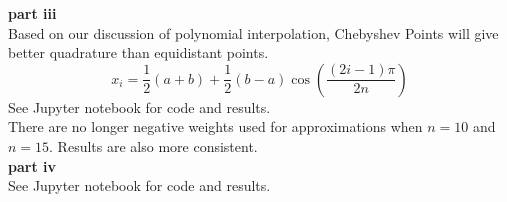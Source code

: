 \documentclass{article} %
\begin{document}
\textbf{part iii} \\
Based on our discussion of polynomial interpolation, Chebyshev Points will give better quadrature than equidistant points.
\begin{equation*}
x_i = \frac{1}{2}(a+b) + \frac{1}{2}(b-a)\cos(\frac{(2i-1)\pi}{2n})
\end{equation*}
See Jupyter notebook for code and results. \\
There are no longer negative weights used for approximations when $n=10$ and $n=15$.  Results are also more consistent.
\\

\textbf{part iv} \\
See Jupyter notebook for code and results.
\\
\end{document}

